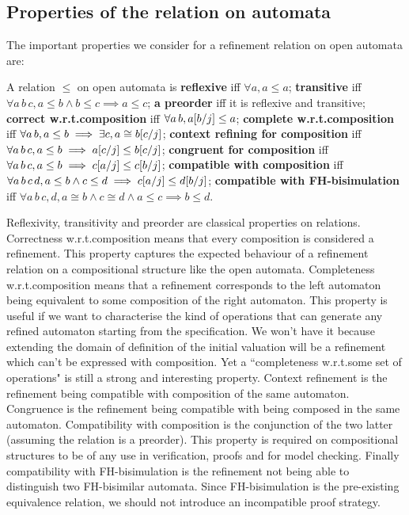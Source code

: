 \documentclass{article}
\begin{document}
\subsection{Properties of the relation on automata}
The important properties we consider for a refinement relation on open automata are:
\begin{defi} A relation \(\leq\) on open automata is
 \textbf{reflexive} iff \(\forall a, a \leq a\);
 \textbf{transitive} iff \(\forall a\, b\, c, a \leq b \wedge b \leq c \implies a \leq c\);
 \textbf{a preorder} iff it is reflexive and transitive;
 \textbf{correct w.r.t.\@ composition} iff \(\forall a\, b, a{\left[b\middle/j\right]} \leq a\);
 \textbf{complete w.r.t.\@ composition} iff \(\forall a\, b, a \leq b \implies \exists c, a \cong b{\left[c\middle/j\right]}\);
 \textbf{context refining for composition} iff \(\forall a\, b\, c, a \leq b \implies a{\left[c\middle/j\right]} \leq b{\left[c\middle/j\right]}\);
 \textbf{congruent for composition} iff \(\forall a\, b\, c, a \leq b \implies c{\left[a\middle/j\right]} \leq c{\left[b\middle/j\right]}\);
 \textbf{compatible with composition} iff \(\forall a\, b\, c\, d, a \leq b \wedge c \leq d \implies c{\left[a\middle/j\right]} \leq d{\left[b\middle/j\right]}\);
 \textbf{compatible with FH-bisimulation} iff \(\forall a\, b\, c, d, a \cong b \wedge c \cong d \wedge a \leq c \implies b \leq d\).
\end{defi}
Reflexivity, transitivity and preorder are classical properties on relations.
Correctness w.r.t.\@ composition means that every composition is considered a refinement.
This property captures the expected behaviour of a refinement relation on a compositional structure like the open automata.
Completeness w.r.t.\@ composition means that a refinement corresponds to the left automaton being equivalent to some composition of the right automaton.
This property is useful if we want to characterise the kind of operations that can generate any refined automaton starting from the specification.
We won't have it because extending the domain of definition of the initial valuation will be a refinement which can't be expressed with composition.
Yet a ``completeness w.r.t.\@ some set of operations" is still a strong and interesting property.
Context refinement is the refinement being compatible with composition of the same automaton.
Congruence is the refinement being compatible with being composed in the same automaton.
Compatibility with composition is the conjunction of the two latter (assuming the relation is a preorder).
This property is required on compositional structures to be of any use in verification, proofs and for model checking.
Finally compatibility with FH-bisimulation is the refinement not being able to distinguish two FH-bisimilar automata.
Since FH-bisimulation is the pre-existing equivalence relation, we should not introduce an incompatible proof strategy.
\end{document}
